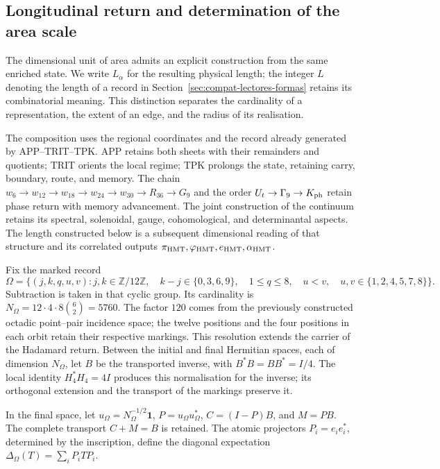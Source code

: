 \subsection{Longitudinal return and determination of the area scale}
\label{rev5:longitud}

The dimensional unit of area admits an explicit construction
from the same enriched state. We write \(L_\alpha\) for the
resulting physical length; the integer \(L\) denoting the length
of a record in Section~\ref{sec:compat-lectores-formas} retains
its combinatorial meaning. This distinction separates the cardinality
of a representation, the extent of an edge, and the radius of its realisation.

The composition uses the regional coordinates and the record already
generated by APP--TRIT--TPK. APP retains both sheets with their remainders
and quotients; TRIT orients the local regime; TPK prolongs the state,
retaining carry, boundary, route, and memory. The chain
\(w_6\to w_{12}\to w_{18}\to w_{24}\to w_{30}\to R_{36}\to G_9\)
and the order \(U_t\to\Gamma_9\to K_{\rm ph}\) retain
phase return with memory advancement. The joint construction
of the continuum retains its spectral, solenoidal, gauge,
cohomological, and determinantal aspects. The length constructed below
is a subsequent dimensional reading of that structure and its correlated outputs
\(\pi_{\rm HMT},\varphi_{\rm HMT},e_{\rm HMT},\alpha_{\rm HMT}\).

Fix the marked record
\[
 \Omega=\{(j,k,q,u,v):j,k\in\mathbb Z/12\mathbb Z,\quad
 k-j\in\{0,3,6,9\},\quad1\le q\le8,\quad
 u<v,\quad u,v\in\{1,2,4,5,7,8\}\}.
\]
Subtraction is taken in that cyclic group. Its cardinality is
\(N_\Omega=12\cdot4\cdot8\binom62=5760\).
The factor \(120\) comes from the previously constructed octadic
point--pair incidence space; the twelve positions and the four
positions in each orbit retain their respective markings. This
resolution extends the carrier of the Hadamard return. Between the
initial and final Hermitian spaces, each of dimension \(N_\Omega\),
let \(B\) be the transported inverse, with
\(B^*B=BB^*=I/4\). The local identity
\(H_4^*H_4=4I\) produces this normalisation for the inverse;
its orthogonal extension and the transport of the markings preserve it.

In the final space, let
\(u_\Omega=N_\Omega^{-1/2}\mathbf1\),
\(P=u_\Omega u_\Omega^*\), \(C=(I-P)B\), and \(M=PB\).
The complete transport \(C+M=B\) is retained. The atomic projectors
\(P_i=e_ie_i^*\), determined by the inscription,
define the diagonal expectation
\(\Delta_\Omega(T)=\sum_iP_iTP_i\).

